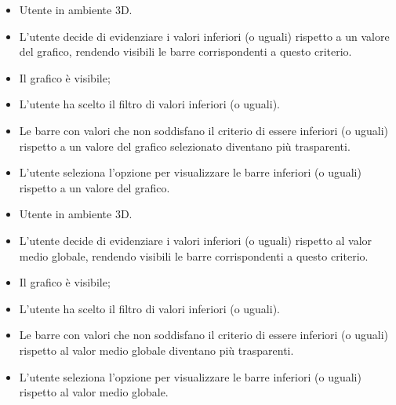 \UCdsc
{ %
    \begin{itemize}
        \item Utente in ambiente 3D.
    \end{itemize}
}
{ %
    \begin{itemize}
        \item L'utente decide di evidenziare i valori inferiori (o uguali) rispetto a un valore del grafico, rendendo visibili le barre corrispondenti a questo criterio.
    \end{itemize}
}
{ %
    \begin{itemize}
        \item Il grafico è visibile;
        \item L'utente ha scelto il filtro di valori inferiori (o uguali).
    \end{itemize}
}
{ %
    \begin{itemize}
        \item Le barre con valori che non soddisfano il criterio di essere inferiori (o uguali) rispetto a un valore del grafico selezionato diventano più trasparenti.
    \end{itemize}
}
{ %
    \begin{itemize}
        \item L'utente seleziona l'opzione per visualizzare le barre inferiori (o uguali) rispetto a un valore del grafico.
    \end{itemize}
}


\UCdsc
{ %
    \begin{itemize}
        \item Utente in ambiente 3D.
    \end{itemize}
}
{ %
    \begin{itemize}
        \item L'utente decide di evidenziare i valori inferiori (o uguali) rispetto al valor medio globale, rendendo visibili le barre corrispondenti a questo criterio.
    \end{itemize}
}
{ %
    \begin{itemize}
        \item Il grafico è visibile;
        \item L'utente ha scelto il filtro di valori inferiori (o uguali).
    \end{itemize}
}
{ %
    \begin{itemize}
        \item Le barre con valori che non soddisfano il criterio di essere inferiori (o uguali) rispetto al valor medio globale diventano più trasparenti.
    \end{itemize}
}
{ %
    \begin{itemize}
        \item L'utente seleziona l'opzione per visualizzare le barre inferiori (o uguali) rispetto al valor medio globale.
    \end{itemize}
}




